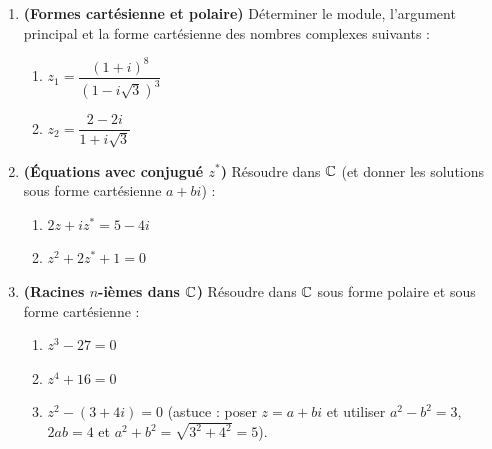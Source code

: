 \begin{enumerate}[label=\textbf{Exercice 4.\arabic* :}, leftmargin=*]
    \item \textbf{(Formes cartésienne et polaire)} Déterminer le module, l'argument principal et la forme cartésienne des nombres complexes suivants :
    \begin{enumerate}[label=(\alph*)]
        \item $z_1 = \dfrac{(1 + i)^8}{(1 - i\sqrt{3})^3}$
        \item $z_2 = \dfrac{2 - 2i}{1 + i\sqrt{3}}$
    \end{enumerate}
    \item \textbf{(Équations avec conjugué $z^*$)} Résoudre dans $\mathbb{C}$ (et donner les solutions sous forme cartésienne $a + bi$) :
    \begin{enumerate}[label=(\alph*)]
        \item $2z + iz^* = 5 - 4i$
        \item $z^2 + 2z^* + 1 = 0$
    \end{enumerate}
    \item \textbf{(Racines $n$-ièmes dans $\mathbb{C}$)} Résoudre dans $\mathbb{C}$ sous forme polaire et sous forme cartésienne :
    \begin{enumerate}[label=(\alph*)]
        \item $z^3 - 27 = 0$
        \item $z^4 + 16 = 0$
        \item $z^2 - (3 + 4i) = 0$ (astuce : poser $z = a + bi$ et utiliser $a^2 - b^2 = 3$, $2ab = 4$ et $a^2 + b^2 = \sqrt{3^2+4^2} = 5$).
    \end{enumerate}
\end{enumerate}
